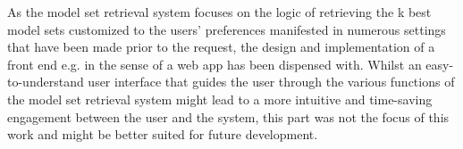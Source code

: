 As the model set retrieval system focuses on the logic of retrieving the k best model sets customized to the users’ preferences manifested in numerous settings that have been made prior to the request, the design and implementation of a front end e.g. in the sense of a web app has been dispensed with. Whilst an easy-to-understand user interface that guides the user through the various functions of the model set retrieval system might lead to a more intuitive and time-saving engagement between the user and the system, this part was not the focus of this work and might be better suited for future development.
